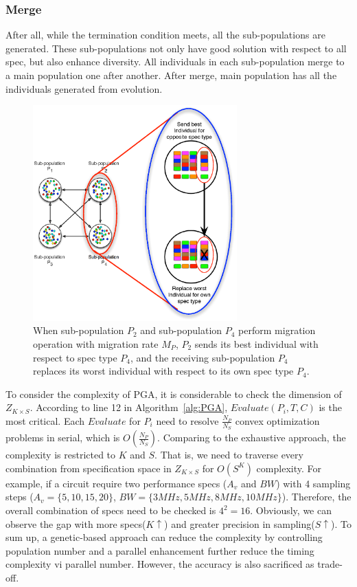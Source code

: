     \subsubsection{Merge}
      After all, while the termination condition meets, all the sub-populations are generated. These sub-populations not only have good solution with respect to all spec, but also enhance diversity. All individuals in each sub-population merge to a main population one after another. After merge, main population has all the individuals generated from evolution. 
  
  
      \begin{figure}[t]
        \centering
        \includegraphics[width=0.7\textwidth]{Fig/Chapter2/PAGEMigration.eps}
        \caption{When sub-population $P_2$ and sub-population $P_4$ perform migration operation with migration rate $M_P$, $P_2$ sends its best individual with respect to spec type $P_4$, and the receiving sub-population $P_4$ replaces its worst individual with respect to its own spec type $P_4$.} 
        \label{fig:Migration}
      \end{figure}

    To consider the complexity of PGA, it is considerable to check the dimension of $Z_{K\times S}$. According to line 12 in Algorithm~\ref{alg:PGA}, $Evaluate(P_i,T,C)$ is the most critical. Each $Evaluate$ for $P_i$ need to resolve $\frac{N_P}{N_S}$ convex optimization problems in serial, which is $O(\frac{N_P}{N_S})$. Comparing to the exhaustive approach, the complexity is restricted to $K$ and $S$. That is, we need to traverse every combination from specification space in $Z_{K\times S}$ for $O(S^K)$ complexity. For example, if a circuit require two performance specs ($A_v$ and $BW$) with 4 sampling steps ($A_v = \{5,10,15,20\}$, $BW = \{3MHz,5MHz,8MHz,10MHz\}$). Therefore, the overall combination of specs need to be checked is $4^2=16$. Obviously, we can observe the gap with more specs($K\uparrow$) and greater precision in sampling($S\uparrow$). To sum up, a genetic-based approach can reduce the complexity by controlling population number and a parallel enhancement further reduce the timing complexity vi parallel number. However, the accuracy is also sacrificed as trade-off.



